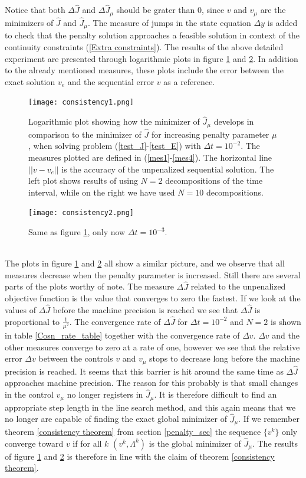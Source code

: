 Notice that both $\Delta\hat J$ and $\Delta \hat J_{\mu}$ should be grater than $0$, since $v$ and $v_{\mu}$ are the minimizers of $\hat J$ and $\hat J_ {\mu}$. The measure of jumps in the state equation $\Delta y$ is added to check that the penalty solution approaches a feasible solution in context of the continuity constraints (\ref{Extra constraints}). The results of the above detailed experiment are presented through logarithmic plots in figure \ref{Cons1_fig} and \ref{Cons2_fig}. In addition to the already mentioned measures, these plots include the error between the exact solution $v_e$ and the sequential error $v$ as a reference.
\\
\begin{figure}[!h]
\centering
\texttt{[image: consistency1.png]}
\caption{Logarithmic plot showing how the minimizer of $\hat J_{\mu}$ develops in comparison to the minimizer of $\hat J$ for increasing penalty parameter $\mu$, when solving problem (\ref{test_J}-\ref{test_E}) with $\Delta t = 10^{-2}$. The measures plotted are defined in (\ref{mes1}-\ref{mes4}). The horizontal line $||v-v_e||$ is the accuracy of the unpenalized sequential solution. The left plot shows results of using $N=2$ decompositions of the time interval, while on the right we have used $N=10$ decompositions.}
\label{Cons1_fig}
\end{figure}
\noindent
\begin{figure}[!h]
\centering
\texttt{[image: consistency2.png]}
\caption{Same as figure \ref{Cons1_fig}, only now $\Delta t = 10^{-3}$.}
\label{Cons2_fig}
\end{figure}
\noindent
\\
The plots in figure \ref{Cons1_fig} and \ref{Cons2_fig} all show a similar picture, and we observe that all measures decrease when the penalty parameter is increased. Still there are several parts of the plots worthy of note. The measure $\Delta\hat J$ related to the unpenalized objective function is the value that converges to zero the fastest. If we look at the values of $\Delta\hat J$ before the machine precision is reached we see that $\Delta \hat J$ is proportional to $\frac{1}{\mu^2}$. The convergence rate of $\Delta\hat J$ for $\Delta t=10^{-2}$ and $N=2$ is shown in table \ref{Cosn_rate_table} together with the convergence rate of $\Delta v$. $\Delta v$ and the other measures converge to zero at a rate of one, however we see that the relative error $\Delta v$ between the controls $v$ and $v_{\mu}$ stops to decrease long before the machine precision is reached. It seems that this barrier is hit around the same time as $\Delta\hat J$ approaches machine precision. The reason for this probably is that small changes in the control $v_{\mu}$ no longer registers in $\hat J_{\mu}$. It is therefore difficult to find an appropriate step length in the line search method, and this again means that we no longer are capable of finding the exact global minimizer of $\hat J_{\mu}$. If we remember theorem \ref{consistency theorem} from section \ref{penalty_sec} the sequence $\{v^{k}\}$ only converge toward $v$ if for all $k$ $(v^{k},\Lambda^k)$ is the global minimizer of $\hat J_{\mu}$. The results of figure \ref{Cons1_fig} and \ref{Cons2_fig} is therefore in line with the claim of theorem \ref{consistency theorem}.
